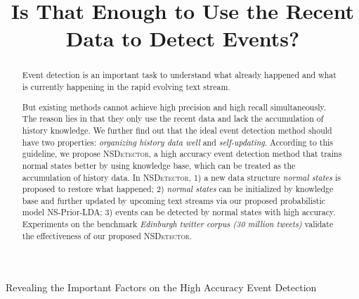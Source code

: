 \documentclass[conference,compsoc]{IEEEtran}
\begin{document}
\title{Is That Enough to Use the Recent Data to Detect Events?}
Revealing the Important Factors on the High Accuracy Event Detection

\maketitle
\begin{abstract}
Event detection is an important task to understand what already happened and what is currently happening in the rapid evolving text stream. 


But existing methods cannot achieve high precision and high recall simultaneously. 
The reason lies in that they only use the recent data and lack the accumulation of history knowledge. 
We further find out that the ideal event detection method should have two properties: \textit{organizing history data well} and \textit{self-updating}.
According to this guideline, we propose \textsc{NSDetector}, a high accuracy event detection method that trains normal states better by using knowledge base, which can be treated as the accumulation of history data. 
In \textsc{NSDetector}, 1) a new data structure \textit{normal states} is proposed to restore what happened; 2) \textit{normal states} can be initialized by knowledge base and further updated by upcoming text streams via our proposed probabilistic model NS-Prior-LDA; 3) events can be detected by normal states with high accuracy.
Experiments on the benchmark \textit{Edinburgh twitter corpus (30 million tweets)} validate the effectiveness of our proposed \textsc{NSDetector}.
\end{abstract}
\end{document}

